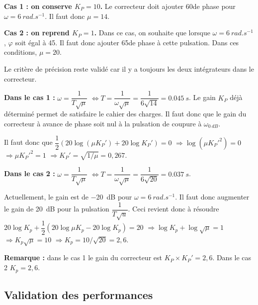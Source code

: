 \ifprof
\begin{corrige}
\textbf{Cas 1 : on conserve $K_P=10$.}
 Le correcteur doit ajouter 60\degres de phase pour $\omega=\SI{6}{rad.s^{-1}}$. Il faut donc $\mu=14$.
 
 \textbf{Cas 2 : on reprend $K_P=1$.}
 Dans ce cas, on souhaite que lorsque $\omega=\SI{6}{rad.s^{-1}}$, $\varphi$ soit égal à 45\degres. Il faut donc ajouter 65\degres de phase à cette pulsation. Dans ces conditions, $\mu=20$.
 
Le critère de précision reste validé car il y a toujours les deux intégrateurs dans le correcteur. 
\end{corrige}
\else
\fi


\ifprof
\begin{corrige}
\textbf{Dans le cas 1 :}
$\omega=\dfrac{1}{T\sqrt{\mu}}$ $ \Leftrightarrow T=\dfrac{1}{\omega\sqrt{\mu}}=\dfrac{1}{6\sqrt{14}}=\SI{0,045}{s}$.
Le gain $K_P$ déjà déterminé permet de satisfaire le cahier des charges. Il faut donc que le gain du correcteur à avance de phase soit nul à la pulsation de coupure à $\omega_{\SI{0}{dB}}$.

Il faut donc que $\dfrac{1}{2}\left( 20\log\left( \mu K_P'\right) + 20\log K_P'  \right)=0 $ 
$\Rightarrow \log\left( \mu K_P'^2\right)  =0$
$\Rightarrow  \mu K_P'^2 =1$
$\Rightarrow   K_P' =\sqrt{1/\mu}=0,267$.

\textbf{Dans le cas 2 :}
$\omega=\dfrac{1}{T\sqrt{\mu}}$ $ \Leftrightarrow T=\dfrac{1}{\omega\sqrt{\mu}}=\dfrac{1}{6\sqrt{20}}=\SI{0,037}{s}$.

Actuellement, le gain est de \SI{-20}{dB} pour $\omega=\SI{6}{rad.s^{-1}}$. Il faut donc augmenter le gain de \SI{20}{dB} pour la pulsation $\dfrac{1}{T\sqrt{u}}$. Ceci revient donc à résoudre 
$20\log K_p + \dfrac{1}{2}\left( 20\log \mu K_p  - 20\log K_p \right) = 20$
$\Rightarrow \log K_p +  \log \sqrt{\mu}= 1$
$\Rightarrow  K_p \sqrt{\mu}= 10$
$\Rightarrow  K_p = 10/\sqrt{20}=2,6$.

\textbf{Remarque : } dans le cas 1 le gain du correcteur est $K_P\times K_P' = 2,6$. Dans le cas 2  $K_p=2,6$. 

\end{corrige}
\else
\fi

\subsection*{Validation des performances}

